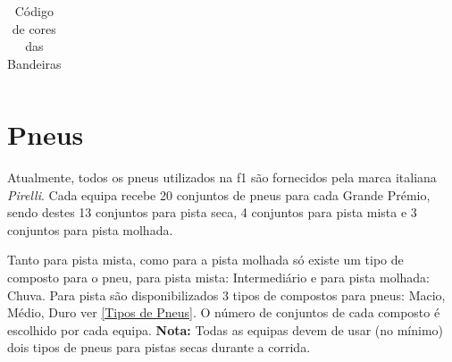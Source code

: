 \documentclass{report}
\begin{document}
\begin{table}[!h]
{\begin{tabular}{|c|l|l|c|c|l|l|l|l|l|l|l|}
\end{tabular}
}
\caption{Código de cores das Bandeiras}
\label{Bandeiras}
\end{table}
\section{Pneus}
\hspace{\parindent}Atualmente, todos os pneus utilizados na \ac{f1} são fornecidos pela marca italiana \textit{Pirelli}. Cada equipa recebe 20 conjuntos de pneus para cada Grande Prémio, sendo destes 13 conjuntos para pista seca, 4 conjuntos para pista mista e 3 conjuntos para pista molhada.

Tanto para pista mista, como para a pista molhada só existe um tipo de composto para o pneu, para pista mista: Intermediário e para pista molhada: Chuva. Para pista são disponibilizados 3 tipos de compostos para pneus: Macio, Médio, Duro ver \ref{Tipos de Pneus}. O número de conjuntos de cada composto é escolhido por cada equipa. \textbf{Nota:} Todas as equipas devem de usar (no mínimo) dois tipos de pneus para pistas secas durante a corrida.
\end{document}
